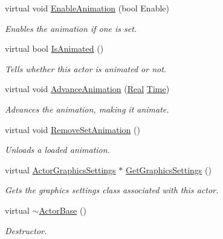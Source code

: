 \begin{DoxyCompactItemize}
virtual void \hyperlink{classphys_1_1ActorBase_a72203a9c7befd1ab606ff69af4183849}{EnableAnimation} (bool Enable)
\begin{DoxyCompactList}\small\item\em Enables the animation if one is set. \item\end{DoxyCompactList}\item 
virtual bool \hyperlink{classphys_1_1ActorBase_ac98f9fdae0da939e352f8fcff217457c}{IsAnimated} ()
\begin{DoxyCompactList}\small\item\em Tells whether this actor is animated or not. \item\end{DoxyCompactList}\item 
virtual void \hyperlink{classphys_1_1ActorBase_a37d5a8a3ae4ca3c6e7d14706096faa85}{AdvanceAnimation} (\hyperlink{namespacephys_af7eb897198d265b8e868f45240230d5f}{Real} \hyperlink{structphys_1_1Time}{Time})
\begin{DoxyCompactList}\small\item\em Advances the animation, making it animate. \item\end{DoxyCompactList}\item 
virtual void \hyperlink{classphys_1_1ActorBase_ac42e5e47504d7f296bb0a2bedc2ded07}{RemoveSetAnimation} ()
\begin{DoxyCompactList}\small\item\em Unloads a loaded animation. \item\end{DoxyCompactList}\item 
virtual \hyperlink{classphys_1_1ActorGraphicsSettings}{ActorGraphicsSettings} $\ast$ \hyperlink{classphys_1_1ActorBase_abaa77d8b4a7aecda0125f91757a97edf}{GetGraphicsSettings} ()
\begin{DoxyCompactList}\small\item\em Gets the graphics settings class associated with this actor. \item\end{DoxyCompactList}\item 
virtual \hyperlink{classphys_1_1ActorBase_a5e5d4b50c83c6851e554b5e7ad65403f}{$\sim$ActorBase} ()
\begin{DoxyCompactList}\small\item\em Destructor. \item\end{DoxyCompactList}\item 

\end{DoxyCompactItemize}
